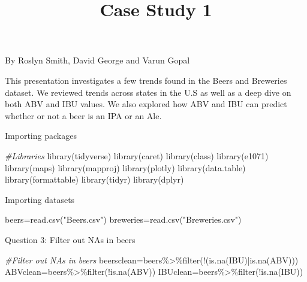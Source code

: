 \documentclass[
]{article}
\title{Case Study 1}
\author{}
\date{\vspace{-2.5em}}
\newenvironment{Shaded}{\begin{snugshade}}{\end{snugshade}}
\newcommand{\CommentTok}[1]{\textcolor[rgb]{0.56,0.35,0.01}{\textit{#1}}}
\newcommand{\FunctionTok}[1]{\textcolor[rgb]{0.00,0.00,0.00}{#1}}
\newcommand{\NormalTok}[1]{#1}
\newcommand{\OtherTok}[1]{\textcolor[rgb]{0.56,0.35,0.01}{#1}}
\newcommand{\SpecialCharTok}[1]{\textcolor[rgb]{0.00,0.00,0.00}{#1}}
\newcommand{\StringTok}[1]{\textcolor[rgb]{0.31,0.60,0.02}{#1}}
\begin{document}
\maketitle

By Roslyn Smith, David George and Varun Gopal

This presentation investigates a few trends found in the Beers and
Breweries dataset. We reviewed trends across states in the U.S as well
as a deep dive on both ABV and IBU values. We also explored how ABV and
IBU can predict whether or not a beer is an IPA or an Ale.

Importing packages

\begin{Shaded}
\begin{Highlighting}[]
\CommentTok{\#Libraries}
\FunctionTok{library}\NormalTok{(tidyverse)}
\FunctionTok{library}\NormalTok{(caret)}
\FunctionTok{library}\NormalTok{(class)}
\FunctionTok{library}\NormalTok{(e1071)}
\FunctionTok{library}\NormalTok{(maps)}
\FunctionTok{library}\NormalTok{(mapproj)}
\FunctionTok{library}\NormalTok{(plotly)}
\FunctionTok{library}\NormalTok{(data.table)}
\FunctionTok{library}\NormalTok{(formattable)}
\FunctionTok{library}\NormalTok{(tidyr)}
\FunctionTok{library}\NormalTok{(dplyr)}
\end{Highlighting}
\end{Shaded}

Importing datasets

\begin{Shaded}
\begin{Highlighting}[]
\NormalTok{beers}\OtherTok{=}\FunctionTok{read.csv}\NormalTok{(}\StringTok{"Beers.csv"}\NormalTok{)}
\NormalTok{breweries}\OtherTok{=}\FunctionTok{read.csv}\NormalTok{(}\StringTok{"Breweries.csv"}\NormalTok{)}
\end{Highlighting}
\end{Shaded}

Question 3: Filter out NAs in beers

\begin{Shaded}
\begin{Highlighting}[]
\CommentTok{\#Filter out NAs in beers}
\NormalTok{beersclean}\OtherTok{=}\NormalTok{beers}\SpecialCharTok{\%\textgreater{}\%}\FunctionTok{filter}\NormalTok{(}\SpecialCharTok{!}\NormalTok{(}\FunctionTok{is.na}\NormalTok{(IBU)}\SpecialCharTok{|}\FunctionTok{is.na}\NormalTok{(ABV)))}
\NormalTok{ABVclean}\OtherTok{=}\NormalTok{beers}\SpecialCharTok{\%\textgreater{}\%}\FunctionTok{filter}\NormalTok{(}\SpecialCharTok{!}\FunctionTok{is.na}\NormalTok{(ABV))}
\NormalTok{IBUclean}\OtherTok{=}\NormalTok{beers}\SpecialCharTok{\%\textgreater{}\%}\FunctionTok{filter}\NormalTok{(}\SpecialCharTok{!}\FunctionTok{is.na}\NormalTok{(IBU))}
\end{Highlighting}
\end{Shaded}
\end{document}
